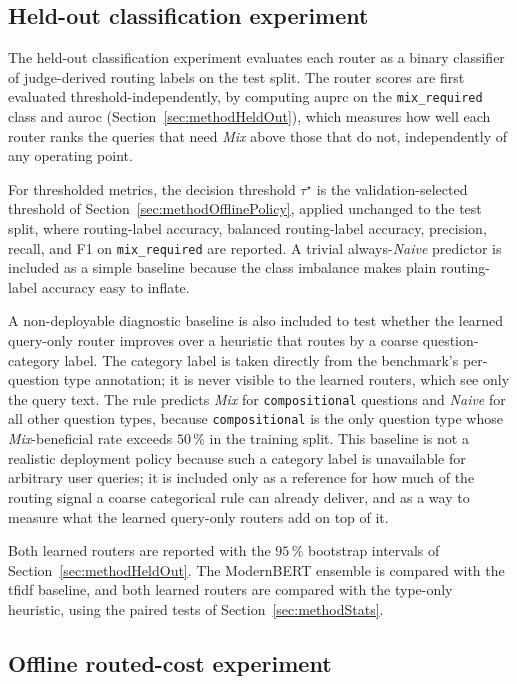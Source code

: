 \documentclass[english, bibtex]{kththesis}               %
\numberwithin{listing}{chapter}
\begin{document}
\subsection{Held-out classification experiment}
\label{sec:implClassification}

The held-out classification experiment evaluates each router as a binary classifier of judge-derived routing labels on the test split. The router scores are first evaluated threshold-independently, by computing \gls{auprc} on the \texttt{mix\_required} class and \gls{auroc} (Section~\ref{sec:methodHeldOut}), which measures how well each router ranks the queries that need \emph{Mix} above those that do not, independently of any operating point.

For thresholded metrics, the decision threshold $\tau^\star$ is the validation-selected threshold of Section~\ref{sec:methodOfflinePolicy}, applied unchanged to the test split, where routing-label accuracy, balanced routing-label accuracy, precision, recall, and F1 on \texttt{mix\_required} are reported. A trivial always-\emph{Naive} predictor is included as a simple baseline because the class imbalance makes plain routing-label accuracy easy to inflate.

A non-deployable diagnostic baseline is also included to test whether the learned query-only router improves over a heuristic that routes by a coarse question-category label. The category label is taken directly from the benchmark's per-question type annotation; it is never visible to the learned routers, which see only the query text. The rule predicts \emph{Mix} for \texttt{compositional} questions and \emph{Naive} for all other question types, because \texttt{compositional} is the only question type whose \emph{Mix}-beneficial rate exceeds $50\,\%$ in the training split. This baseline is not a realistic deployment policy because such a category label is unavailable for arbitrary user queries; it is included only as a reference for how much of the routing signal a coarse categorical rule can already deliver, and as a way to measure what the learned query-only routers add on top of it.

Both learned routers are reported with the $95\,\%$ bootstrap intervals of Section~\ref{sec:methodHeldOut}. The ModernBERT ensemble is compared with the \gls{tfidf} baseline, and both learned routers are compared with the type-only heuristic, using the paired tests of Section~\ref{sec:methodStats}.

\subsection{Offline routed-cost experiment}
\label{sec:implPolicy}
\end{document}
